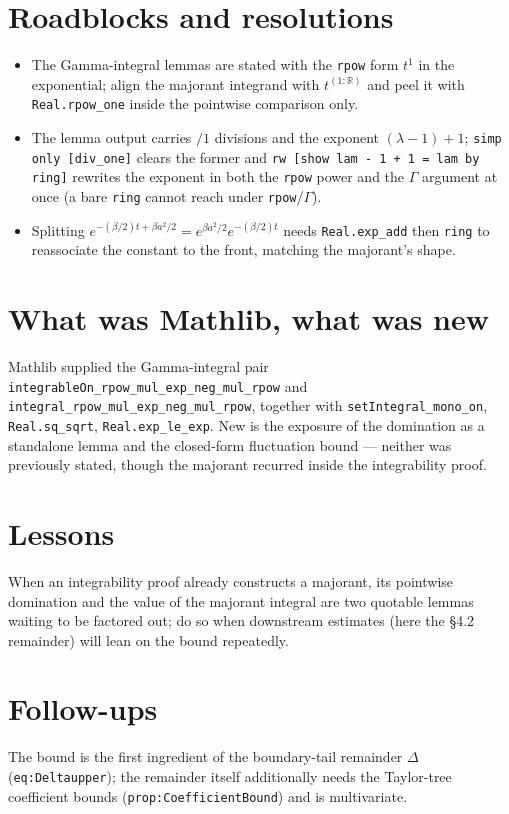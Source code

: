 \documentclass[11pt]{article}
\begin{document}
\section{Roadblocks and resolutions}
\begin{itemize}
\item The Gamma-integral lemmas are stated with the \texttt{rpow} form $t^{1}$ in the exponential; align
the majorant integrand with $t^{(1:\mathbb R)}$ and peel it with \texttt{Real.rpow\_one} inside the
pointwise comparison only.
\item The lemma output carries $/1$ divisions and the exponent $(\lambda-1)+1$; \texttt{simp only
[div\_one]} clears the former and \texttt{rw [show lam - 1 + 1 = lam by ring]} rewrites the exponent in
both the \texttt{rpow} power and the $\Gamma$ argument at once (a bare \texttt{ring} cannot reach under
\texttt{rpow}/$\Gamma$).
\item Splitting $e^{-(\beta/2)t+\beta a^2/2}=e^{\beta a^2/2}e^{-(\beta/2)t}$ needs \texttt{Real.exp\_add}
then \texttt{ring} to reassociate the constant to the front, matching the majorant's shape.
\end{itemize}

\section{What was Mathlib, what was new}
Mathlib supplied the Gamma-integral pair
\texttt{integrableOn\_rpow\_\allowbreak mul\_exp\_\allowbreak neg\_mul\_\allowbreak rpow} and
\texttt{integral\_rpow\_\allowbreak mul\_exp\_\allowbreak neg\_mul\_\allowbreak rpow}, together with
\texttt{setIntegral\_mono\_on}, \texttt{Real.sq\_sqrt}, \texttt{Real.exp\_le\_exp}. New is the exposure of
the domination as a standalone
lemma and the closed-form fluctuation bound --- neither was previously stated, though the majorant
recurred inside the integrability proof.

\section{Lessons}
When an integrability proof already constructs a majorant, its pointwise domination and the value of the
majorant integral are two quotable lemmas waiting to be factored out; do so when downstream estimates
(here the \S4.2 remainder) will lean on the bound repeatedly.

\section{Follow-ups}
The bound is the first ingredient of the boundary-tail remainder $\Delta$ (\texttt{eq:Deltaupper}); the
remainder itself additionally needs the Taylor-tree coefficient bounds (\texttt{prop:CoefficientBound})
and is multivariate.
\end{document}
